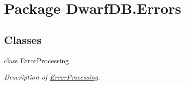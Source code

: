\hypertarget{namespace_dwarf_d_b_1_1_errors}{
\section{Package DwarfDB.Errors}
\label{namespace_dwarf_d_b_1_1_errors}
}
\subsection*{Classes}
\begin{DoxyCompactItemize}
\item 
class \hyperlink{class_dwarf_d_b_1_1_errors_1_1_error_processing}{ErrorProcessing}
\begin{DoxyCompactList}\small\item\em Description of \hyperlink{class_dwarf_d_b_1_1_errors_1_1_error_processing}{ErrorProcessing}. \item\end{DoxyCompactList}\end{DoxyCompactItemize}
